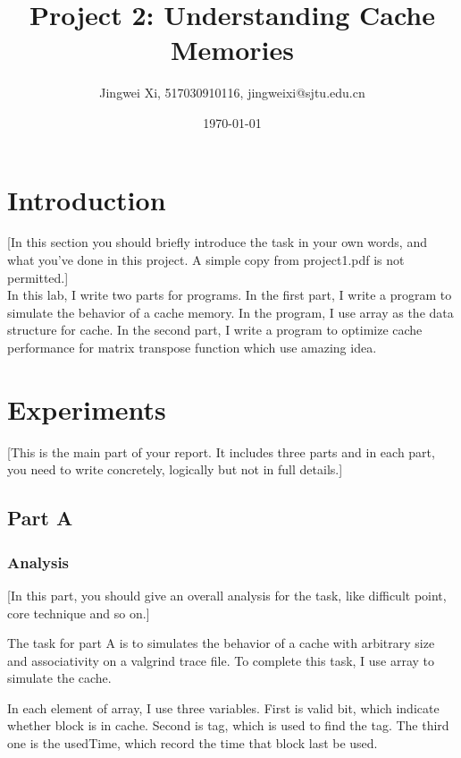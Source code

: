 \documentclass{article}
\title{\textbf{Project 2:  Understanding Cache Memories}} %
\author{Jingwei Xi, 517030910116, jingweixi@sjtu.edu.cn } %
\date{\today} %
\begin{document}
\maketitle %

\section{Introduction}

[In this section you should briefly introduce the task in your own words, and what you’ve done in this project. A simple copy from project1.pdf is not permitted.] \\

In this lab, I write two parts for programs. In the first part, I write a program to simulate the behavior of a cache memory. In the program, I use array as the data structure for cache. In the second part, I write a program to optimize cache performance for matrix transpose function which use amazing idea. 

\section{Experiments}

[This is the main part of your report. It includes three parts and in each part, you need to write concretely, logically but not in full details.]




\subsection{Part A}

\subsubsection{Analysis}

[In this part, you should give an overall analysis for the task, like difficult point, core technique and so on.]

The task for part A is to simulates the behavior of a cache with arbitrary size and associativity on a valgrind trace file. To complete this task, I use array to simulate the cache.

In each element of array, I use three variables. First is valid bit, which indicate whether block is in cache. Second is tag, which is used to find the tag. The third one is the usedTime, which record the time that block last be used. 
\end{document}
